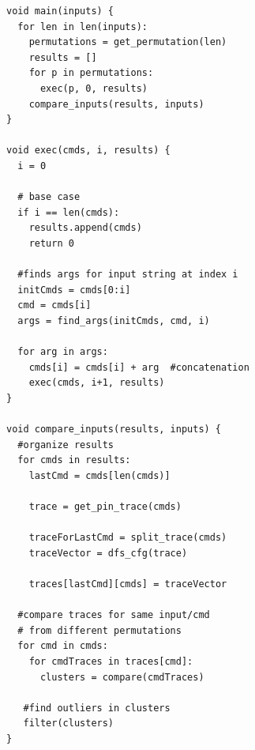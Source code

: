 \documentclass{acm_proc_article-sp}
\begin{document}
\begin{lstlisting}[caption={Pseudocode implementing the protocol state machine generator},label={lst:psmcode}]
void main(inputs) {
  for len in len(inputs):
    permutations = get_permutation(len)
    results = []
    for p in permutations:
      exec(p, 0, results)
    compare_inputs(results, inputs)
}

void exec(cmds, i, results) {  
  i = 0

  # base case
  if i == len(cmds):
    results.append(cmds)
    return 0

  #finds args for input string at index i
  initCmds = cmds[0:i]
  cmd = cmds[i]
  args = find_args(initCmds, cmd, i)

  for arg in args:
    cmds[i] = cmds[i] + arg  #concatenation
    exec(cmds, i+1, results)
}
    
void compare_inputs(results, inputs) {
  #organize results
  for cmds in results:
    lastCmd = cmds[len(cmds)]
    
    trace = get_pin_trace(cmds)
    
    traceForLastCmd = split_trace(cmds)
    traceVector = dfs_cfg(trace) 
    
    traces[lastCmd][cmds] = traceVector
  
  #compare traces for same input/cmd
  # from different permutations
  for cmd in cmds:
    for cmdTraces in traces[cmd]:
      clusters = compare(cmdTraces)
   
   #find outliers in clusters
   filter(clusters)
}
		
\end{lstlisting}
\end{document}
